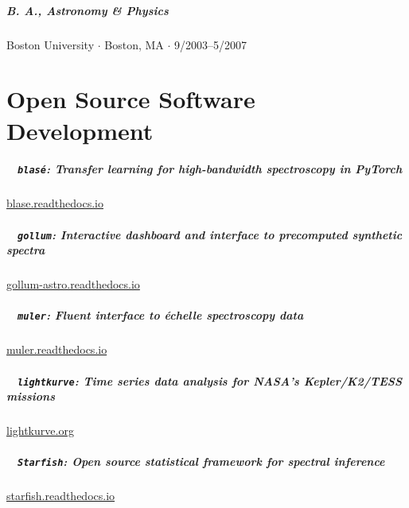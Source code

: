 \documentclass[10pt,letterpaper]{article}
\begin{document}
\subparagraph{\textbf{B. A.}, Astronomy \& Physics}
Boston University $\cdot$ Boston, MA $\cdot$ 9/2003--5/2007

\section*{Open Source Software Development}

\subparagraph{\faMicrochip ~ \texttt{blas\'e}: Transfer learning for high-bandwidth spectroscopy in PyTorch}
\href{https://blase.readthedocs.io}{blase.readthedocs.io}

\subparagraph{\faSlidersH ~ \texttt{gollum}: Interactive dashboard and interface to precomputed synthetic spectra}
\href{https://gollum-astro.readthedocs.io}{gollum-astro.readthedocs.io}

\subparagraph{\faRainbow ~ \texttt{muler}: Fluent interface to \'echelle spectroscopy data}
\href{https://github.com/OttoStruve/muler}{muler.readthedocs.io}

\subparagraph{\faHourglassHalf ~ \texttt{lightkurve}: Time series data analysis for NASA's Kepler/K2/TESS missions}
\href{http://docs.lightkurve.org/}{lightkurve.org}

\subparagraph{\faCloudSun ~ \texttt{Starfish}: Open source statistical framework for spectral inference}
\href{https://starfish.readthedocs.io}{starfish.readthedocs.io}






\end{document}
